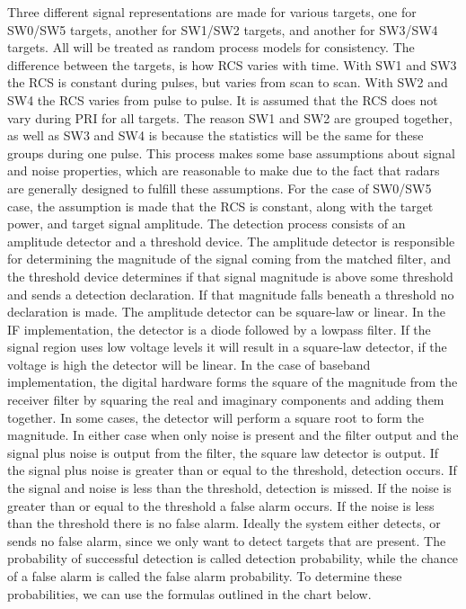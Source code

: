 \documentclass[12pt]{article}
\begin{document}
Three different signal representations are made for various targets, one for SW0/SW5 targets, another for SW1/SW2 targets, and another for SW3/SW4 targets. All will be treated as random process models for consistency. The difference between the targets, is how RCS varies with time. With SW1 and SW3 the RCS is constant during pulses, but varies from scan to scan. With SW2 and SW4 the RCS varies from pulse to pulse. It is assumed that the RCS does not vary during PRI for all targets. The reason SW1 and SW2 are grouped together, as well as SW3 and SW4 is because the statistics will be the same for these groups during one pulse. This process makes some base assumptions about signal and noise properties, which are reasonable to make due to the fact that radars are generally designed to fulfill these assumptions. For the case of SW0/SW5 case, the assumption is made that the RCS is constant, along with the target power, and target signal amplitude. 
The detection process consists of an amplitude detector and a threshold device. The amplitude detector is responsible for determining the magnitude of the signal coming from the matched filter, and the threshold device determines if that signal magnitude is above some threshold and sends a detection declaration. If that magnitude falls beneath a threshold no declaration is made. The amplitude detector can be square-law or linear. In the IF implementation, the detector is a diode followed by a lowpass filter. If the signal region uses low voltage levels it will result in a square-law detector, if the voltage is high the detector will be linear. In the case of baseband implementation, the digital hardware forms the square of the magnitude from the receiver filter by squaring the real and imaginary components and adding them together. In some cases, the detector will perform a square root to form the magnitude. In either case when only noise is present and the filter output and the signal plus noise is output from the filter, the square law detector is output. If the signal plus noise is greater than or equal to the threshold, detection occurs. If the signal and noise is less than the threshold, detection is missed. If the noise is greater than or equal to the threshold a false alarm occurs. If the noise is less than the threshold there is no false alarm. Ideally the system either detects, or sends no false alarm, since we only want to detect targets that are present. The probability of successful detection is called detection probability, while the chance of a false alarm is called the false alarm probability.  To determine these probabilities, we can use the formulas outlined in the chart below. 
\end{document}
